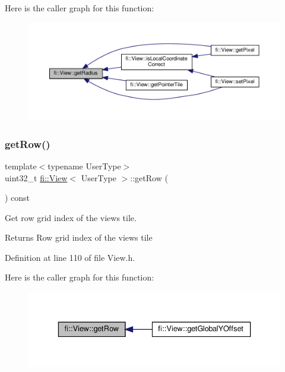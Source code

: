 Here is the caller graph for this function\+:
\nopagebreak
\begin{figure}[H]
\begin{center}
\leavevmode
\includegraphics[width=350pt]{d5/dd4/classfi_1_1View_a5fb12e145b33bc8b27a58d56d23fb774_icgraph}
\end{center}
\end{figure}
\mbox{\label{classfi_1_1View_a42316b387625b552c0ea5b9c01df49b2}} 
\subsubsection{\texorpdfstring{get\+Row()}{getRow()}}
{\footnotesize\ttfamily template$<$typename User\+Type$>$ \\
uint32\+\_\+t \hyperlink{classfi_1_1View}{fi\+::\+View}$<$ User\+Type $>$\+::get\+Row (\begin{DoxyParamCaption}{ }\end{DoxyParamCaption}) const\hspace{0.3cm}{\ttfamily [inline]}}



Get row grid index of the view\textquotesingle{}s tile. 

\begin{DoxyReturn}{Returns}
Row grid index of the view\textquotesingle{}s tile 
\end{DoxyReturn}


Definition at line 110 of file View.\+h.

Here is the caller graph for this function\+:
\nopagebreak
\begin{figure}[H]
\begin{center}
\leavevmode
\includegraphics[width=336pt]{d5/dd4/classfi_1_1View_a42316b387625b552c0ea5b9c01df49b2_icgraph}
\end{center}
\end{figure}
\mbox{\label{classfi_1_1View_a08d9c1b251ce6ce11ff51cde2046a84d}} 
